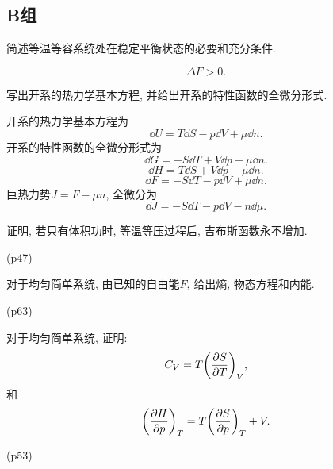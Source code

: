 \subsection{B组}
\begin{questions}
  \question 简述等温等容系统处在稳定平衡状态的必要和充分条件.
  \begin{solution}
    \begin{equation}
      \Delta F > 0.
    \end{equation}
  \end{solution}
  \question 写出开系的热力学基本方程, 并给出开系的特性函数的全微分形式.
  \begin{solution}
    开系的热力学基本方程为
    \begin{equation}
      \dd U = T\dd S - p\dd V + \mu\dd n.
    \end{equation}
    开系的特性函数的全微分形式为
    \begin{equation}
      \dd G = -S\dd T + V\dd p +\mu\dd n.
    \end{equation}
    \begin{equation}
      \dd H = T\dd S + V\dd p + \mu\dd n.
    \end{equation}
    \begin{equation}
      \dd F = -S\dd T - p\dd V + \mu\dd n.
    \end{equation}
    巨热力势$J=F-\mu n$, 全微分为
    \begin{equation}
      \dd J = -S\dd T - p\dd V - n\dd \mu.
    \end{equation}
  \end{solution}
  \question 证明, 若只有体积功时, 等温等压过程后, 吉布斯函数永不增加.
  \begin{solution}
    (p47)
  \end{solution}

  \question 对于均匀简单系统, 由已知的自由能$F$, 给出熵, 物态方程和内能.
  \begin{solution}
    (p63)
  \end{solution}
  \question 对于均匀简单系统, 证明:
  \begin{equation}
    C_V = T\qty(\pdv{S}{T})_V,
  \end{equation}
  和
  \begin{equation}
    \qty(\pdv{H}{p})_T = T\qty(\pdv{S}{p})_T + V.
  \end{equation}

  \begin{solution}
    (p53)
  \end{solution}
\end{questions}